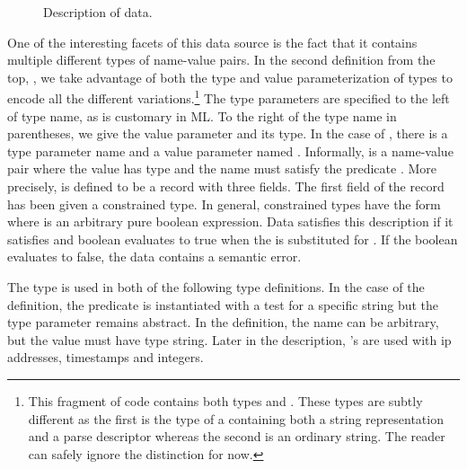 
\begin{figure}
  \centering
  \small
  
  \caption{Description of \darkstar{} data.}
  \label{fig:darkstar-ml}
\end{figure}

One of the interesting facets of this data source is the fact that
it contains multiple different types of name-value pairs.  In the
second definition from the top, , we take
advantage of both the type and value parameterization of types to
encode all the different 
variations.\footnote{This fragment of code contains both
types  and .  These types are subtly different
as the first is the type of a \pvalue{} containing both a string 
representation and a parse descriptor whereas the second is an 
ordinary string.  The reader can safely ignore the distinction for now.}    
The type parameters
are specified to the left of type name, as is customary in ML.
To the right of the type name in parentheses, we give the
value parameter and its type. 
In the case of , there is a type parameter name 
and a value parameter named .  Informally,
 is a name-value pair where the value has type 
and the name must satisfy the predicate .  More precisely,
 is defined to be
a record with three fields.  The first field of the record
has been given a constrained type.  In general, constrained types have the
form  where  is an arbitrary pure boolean 
expression.  Data  satisfies this description if it satisfies
 and boolean  evaluates to true when the \pvalue{} 
is substituted for .  If the boolean evaluates to false, the
data contains a semantic error.  

The  type is used in both of the following type definitions.
In the case of the  definition, the predicate is instantiated
with a test for a specific string but the type parameter remains 
abstract.  In the  
definition, the name can be arbitrary, but the value must have 
type string. Later in the description, 's
are used with ip addresses, timestamps and integers. 

